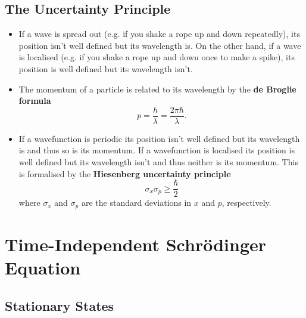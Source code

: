 \documentclass{article}
\begin{document}
\subsection{The Uncertainty Principle}

\begin{itemize}
  \item If a wave is spread out (e.g. if you shake a rope up and down repeatedly), its position isn't well defined but its wavelength is. On the other hand, if a wave is localised (e.g. if you shake a rope up and down once to make a spike), its position is well defined but its wavelength isn't.

  \item The momentum of a particle is related to its wavelength by the \textbf{de Broglie formula} \[p = \frac{h}{\lambda} = \frac{2 \pi \hbar}{\lambda}.\]

  \item If a wavefunction is periodic its position isn't well defined but its wavelength is and thus so is its momentum. If a wavefunction is localised its position is well defined but its wavelength isn't and thus neither is its momentum. This is formalised by the \textbf{Hiesenberg uncertainty principle} \[\sigma_x \sigma_p \ge \frac{\hbar}{2}\] where $\sigma_x$ and $\sigma_p$ are the standard deviations in $x$ and $p$, respectively.
\end{itemize}

\section{Time-Independent Schrödinger Equation}

\subsection{Stationary States}
\end{document}
